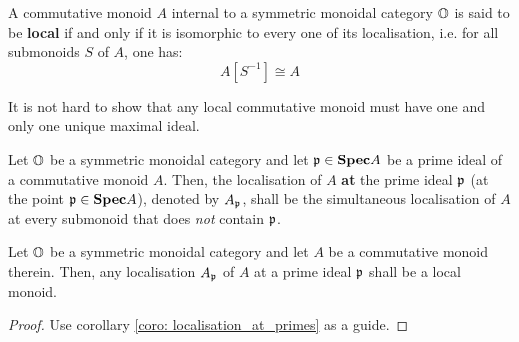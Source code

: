                 \begin{definition} \label{def: local_monoids}
                    A commutative monoid $A$ internal to a symmetric monoidal category $\mathbb{O}$ is said to be \textbf{local} if and only if it is isomorphic to every one of its localisation, i.e. for all submonoids $S$ of $A$, one has:
                        $$A[S^{-1}] \cong A$$
                \end{definition}
                \begin{remark}
                    It is not hard to show that any local commutative monoid must have one and only one unique maximal ideal.
                \end{remark}
                \begin{convention} \label{conv: localising_commutative_monoids_at_primes}
                    Let $\mathbb{O}$ be a symmetric monoidal category and let $\mathfrak{p} \in \mathbf{Spec} A$ be a prime ideal of a commutative monoid $A$. Then, the localisation of $A$ \textbf{at} the prime ideal $\mathfrak{p}$ (at the point $\mathfrak{p} \in \mathbf{Spec} A$), denoted by $A_{\mathfrak{p}}$, shall be the simultaneous localisation of $A$ at every submonoid that does \textit{not} contain $\mathfrak{p}$. 
                \end{convention}
                \begin{lemma} \label{lemma: localisations_at_primes_are_local}
                    Let $\mathbb{O}$ be a symmetric monoidal category and let $A$ be a commutative monoid therein. Then, any localisation $A_{\mathfrak{p}}$ of $A$ at a prime ideal $\mathfrak{p}$ shall be a local monoid.
                \end{lemma}
                    \begin{proof}
                        Use corollary \ref{coro: localisation_at_primes} as a guide.      
                    \end{proof}
                    
